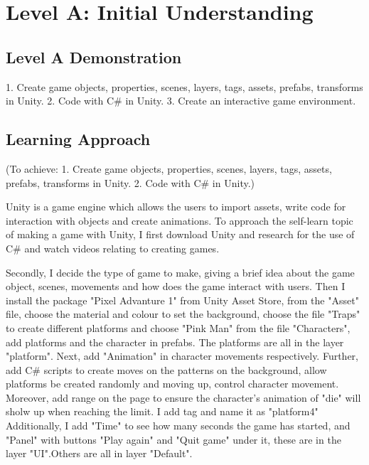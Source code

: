 \documentclass[a4paper, 11pt]{report}
\begin{document}
\tableofcontents
\newpage
\section{Level A: Initial Understanding}
\vspace{5mm}
\subsection{Level A Demonstration}
1.  Create game objects, properties, scenes, layers, tags, assets, prefabs, transforms in Unity.
2.  Code with C\# in Unity.
3.  Create an interactive game environment.

\subsection{Learning Approach}
(To achieve: 1.  Create game objects, properties, scenes, layers, tags, assets, prefabs, transforms in Unity.
2.  Code with C\# in Unity.)

Unity is a game engine which allows the users to import assets, write code for interaction with objects and create animations. To approach the self-learn topic of making a game with Unity, I first download Unity and research for the use of C\#  and watch videos relating to creating games. 

Secondly, I decide the type of game to make,  giving a brief idea about the game object, scenes, movements and how does the game interact with users. Then I install the package "Pixel Advanture 1" from Unity Asset Store,  from the "Asset" file,  choose the material and colour to set the background, choose the file "Traps" to create different platforms and choose "Pink Man" from the file "Characters", add platforms and the character in prefabs. The platforms are all in the layer "platform".  Next,  add "Animation" in character movements respectively.  Further,  add C\# scripts to create moves on the patterns on the background, allow platforms be created randomly and moving up, control character movement. Moreover, add range on the page to ensure the character's animation of "die" will sholw up when reaching the limit.  I add tag and name it as "platform4" Additionally,  I add "Time" to see how many seconds the game has started,  and "Panel" with buttons "Play again" and "Quit game" under it,  these are in the layer "UI".Others are all in layer "Default".
\end{document}
